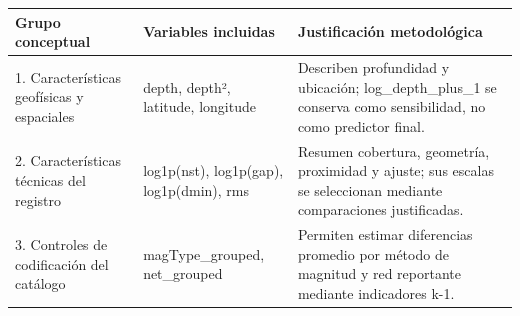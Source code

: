 \begin{tabular}{lll}
\toprule
Grupo conceptual & Variables incluidas & Justificación metodológica \\
\midrule
1. Características geofísicas y espaciales & depth, depth², latitude, longitude & Describen profundidad y ubicación; log\_depth\_plus\_1 se conserva como sensibilidad, no como predictor final. \\
2. Características técnicas del registro & log1p(nst), log1p(gap), log1p(dmin), rms & Resumen cobertura, geometría, proximidad y ajuste; sus escalas se seleccionan mediante comparaciones justificadas. \\
3. Controles de codificación del catálogo & magType\_grouped, net\_grouped & Permiten estimar diferencias promedio por método de magnitud y red reportante mediante indicadores k-1. \\
\bottomrule
\end{tabular}
